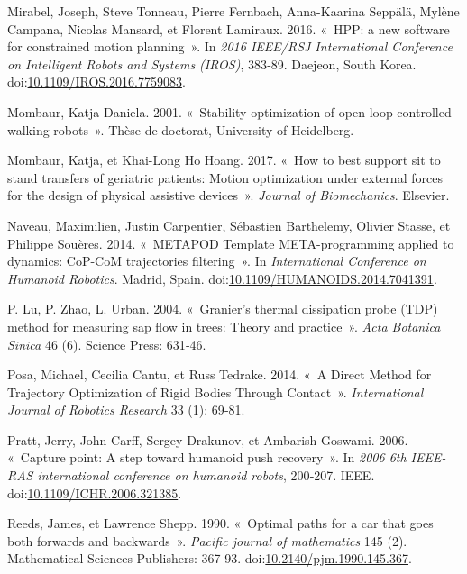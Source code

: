 \documentclass[french,A4paper,]{book}
\begin{document}
\hypertarget{ref-hpp}{}
Mirabel, Joseph, Steve Tonneau, Pierre Fernbach, Anna-Kaarina Seppälä,
Mylène Campana, Nicolas Mansard, et Florent Lamiraux. 2016. «~HPP: a new
software for constrained motion planning~». In \emph{2016 IEEE/RSJ
International Conference on Intelligent Robots and Systems (IROS)},
383‑89. Daejeon, South Korea.
doi:\href{https://doi.org/10.1109/IROS.2016.7759083}{10.1109/IROS.2016.7759083}.

\hypertarget{ref-mombaur01}{}
Mombaur, Katja Daniela. 2001. «~Stability optimization of open-loop
controlled walking robots~». Thèse de doctorat, University of
Heidelberg.

\hypertarget{ref-mombaur17}{}
Mombaur, Katja, et Khai-Long Ho Hoang. 2017. «~How to best support sit
to stand transfers of geriatric patients: Motion optimization under
external forces for the design of physical assistive devices~».
\emph{Journal of Biomechanics}. Elsevier.

\hypertarget{ref-metapod}{}
Naveau, Maximilien, Justin Carpentier, Sébastien Barthelemy, Olivier
Stasse, et Philippe Souères. 2014. «~METAPOD Template META-programming
applied to dynamics: CoP-CoM trajectories filtering~». In
\emph{International Conference on Humanoid Robotics}. Madrid, Spain.
doi:\href{https://doi.org/10.1109/HUMANOIDS.2014.7041391}{10.1109/HUMANOIDS.2014.7041391}.

\hypertarget{ref-lu2004}{}
P. Lu, P. Zhao, L. Urban. 2004. «~Granier's thermal dissipation probe
(TDP) method for measuring sap flow in trees: Theory and practice~».
\emph{Acta Botanica Sinica} 46 (6). Science Press: 631‑46.

\hypertarget{ref-posa14}{}
Posa, Michael, Cecilia Cantu, et Russ Tedrake. 2014. «~A Direct Method
for Trajectory Optimization of Rigid Bodies Through Contact~».
\emph{International Journal of Robotics Research} 33 (1): 69‑81.

\hypertarget{ref-pratt06}{}
Pratt, Jerry, John Carff, Sergey Drakunov, et Ambarish Goswami. 2006.
«~Capture point: A step toward humanoid push recovery~». In \emph{2006
6th IEEE-RAS international conference on humanoid robots}, 200‑207.
IEEE.
doi:\href{https://doi.org/10.1109/ICHR.2006.321385}{10.1109/ICHR.2006.321385}.

\hypertarget{ref-reedsshepp}{}
Reeds, James, et Lawrence Shepp. 1990. «~Optimal paths for a car that
goes both forwards and backwards~». \emph{Pacific journal of
mathematics} 145 (2). Mathematical Sciences Publishers: 367‑93.
doi:\href{https://doi.org/10.2140/pjm.1990.145.367}{10.2140/pjm.1990.145.367}.
\end{document}
